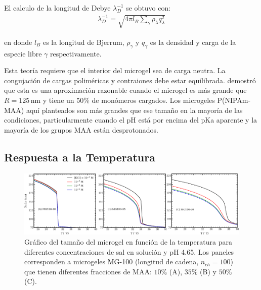 El calculo de la longitud de Debye $\lambda_D^{-1}$ se obtuvo con:
\begin{align}
	\lambda_D^{-1} = \sqrt{4\pi l_B \sum_\gamma{\rho_\lambda q^2_{\lambda}}}
	\label{eq:gel:debye}
\end{align}

\noindent en donde $l_B$ es la longitud de Bjerrum, $\rho_\gamma$ y $q_\gamma$ es la densidad y carga de la especie libre $\gamma$ respectivamente. 

Esta teor\'ia requiere que el interior del microgel sea de carga neutra. La congujaci\'on de cargas polim\'ericas y contraiones debe estar equilibrada. \citet{Claudio2009} demostr\'o que esta es una aproximaci\'on razonable cuando el microgel es m\'as grande que $R = 125\,\text{nm}$ y tiene un 50\% de mon\'omeros cargados. Los microgeles P(NIPAm-MAA) aqu\'i planteados son m\'as grandes que ese tama\~no en la mayor\'ia de las condiciones, particularmente cuando el pH est\'a por encima del pKa aparente y la mayor\'ia de los grupos MAA est\'an desprotonados. %


\subsection{Respuesta a la Temperatura}\label{sec:gel:temperature}

\begin{figure}[!htb]
	\centering
	\includegraphics[width=0.99\linewidth]{Figures/graph-gel/R-T.pdf}
	\caption{Gr\'afico del tama\~no del microgel en funci\'on de la temperatura para diferentes concentraciones de sal en soluci\'on y pH 4.65.
		Los paneles corresponden a microgeles MG-100 (longitud de cadena, $n_{ch}=100$) que tienen diferentes fracciones de MAA: $10\%$ (A), $35\%$ (B) y $50\%$ (C).}
	\label{fig:gel:R-T}
\end{figure}

